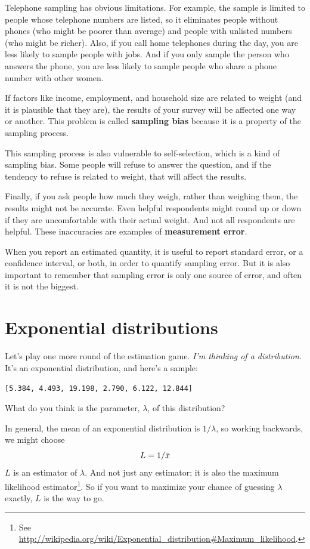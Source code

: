 \documentclass[12pt]{book}
\begin{document}
Telephone sampling has obvious limitations.  For example, the sample
is limited to people whose telephone numbers are listed, so it
eliminates people without phones (who might be poorer than average)
and people with unlisted numbers (who might be richer).  Also, if you
call home telephones during the day, you are less likely to sample
people with jobs.  And if you only sample the person who answers the
phone, you are less likely to sample people who share a phone number
with other women.

If factors like income, employment, and household size are related
to weight (and it is plausible that they are), the results of your
survey will be affected one way or another.  This problem is
called {\bf sampling bias} because it is a property of the sampling
process.

This sampling process is also vulnerable to self-selection, which is a
kind of sampling bias.  Some people will refuse to answer the
question, and if the tendency to refuse is related to weight, that
will affect the results.

Finally, if you ask people how much they weigh, rather than weighing
them, the results might not be accurate.  Even helpful respondents
might round up or down if they are uncomfortable with their actual
weight.  And not all respondents are helpful.  These inaccuracies are
examples of {\bf measurement error}.

When you report an estimated quantity, it is useful to report
standard error, or a confidence interval, or both, in order to
quantify sampling error.  But it is also important to remember that
sampling error is only one source of error, and often it is not the
biggest.


\section{Exponential distributions}

Let's play one more round of the estimation game.
{\em I'm thinking of a distribution.}  It's an exponential distribution, and 
here's a sample:

{\tt [5.384, 4.493, 19.198, 2.790, 6.122, 12.844]}

What do you think is the parameter, $\lambda$, of this distribution?

\newcommand{\lamhat}{L}
\newcommand{\lamhatmed}{L_m}

In general, the mean of an exponential distribution is $1/\lambda$,
so working backwards, we might choose
%
\[ \lamhat = 1 / \xbar\]
%
$\lamhat$ is an
estimator of $\lambda$.  And not just any estimator; it is also the
maximum likelihood estimator\footnote{See
\url{http://wikipedia.org/wiki/Exponential_distribution#Maximum_likelihood}.}.
So if you want to maximize your chance of guessing $\lambda$ exactly,
$\lamhat$ is the way to go.
\end{document}
